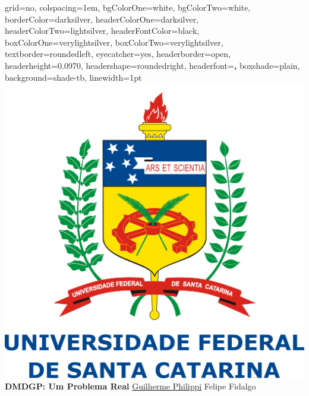 \documentclass[portrait,final]{baposter}
\begin{document}
	
	\newlength{\leftimgwidth}
	\begin{poster}%
		{
			grid=no,
			colspacing=1em,
			bgColorOne=white,
			bgColorTwo=white,
			borderColor=darksilver,
			headerColorOne=darksilver,
			headerColorTwo=lightsilver,
			headerFontColor=black,
			boxColorOne=verylightsilver,
			boxColorTwo=verylightsilver,
			textborder=roundedleft,
			eyecatcher=yes,
			headerborder=open,
			headerheight=0.0970\textheight,
			headershape=roundedright,
			headerfont=\large \textbf, %
			boxshade=plain,
			background=shade-tb,
			linewidth=1pt
		}
		{\includegraphics[scale=0.047]{logo_ufsc.png}}%
		{\sf\bf \LARGE DMDGP: Um Problema Real  \vspace*{0.5em}}
		{\sf \large \underline{Guilherme Philippi} \hspace{0.5em}  \hspace{0.5em} Felipe Fidalgo \\  \vspace*{0.5em}
}
\end{poster}
\end{document}
